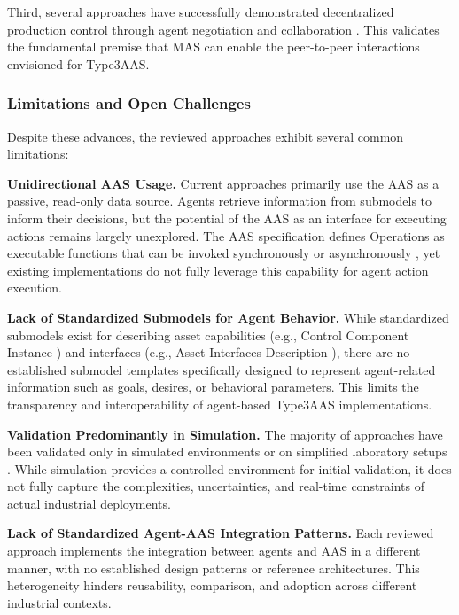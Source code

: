 Third, several approaches have successfully demonstrated decentralized production control through agent negotiation and collaboration \cite{sakurada2022engineering, siatras2024production}. This validates the fundamental premise that \ac{MAS} can enable the peer-to-peer interactions envisioned for \ac{Type3AAS}.

\subsubsection{Limitations and Open Challenges}

Despite these advances, the reviewed approaches exhibit several common limitations:

\textbf{Unidirectional AAS Usage.} Current approaches primarily use the \ac{AAS} as a passive, read-only data source. Agents retrieve information from submodels to inform their decisions, but the potential of the \ac{AAS} as an interface for executing actions remains largely unexplored. The \ac{AAS} specification defines Operations as executable functions that can be invoked synchronously or asynchronously \cite{plattformI40_aas_part2}, yet existing implementations do not fully leverage this capability for agent action execution.

\textbf{Lack of Standardized Submodels for Agent Behavior.} While standardized submodels exist for describing asset capabilities (e.g., Control Component Instance \cite{idta2023controlcomponent}) and interfaces (e.g., Asset Interfaces Description \cite{industrial2024idta}), there are no established submodel templates specifically designed to represent agent-related information such as goals, desires, or behavioral parameters. This limits the transparency and interoperability of agent-based \ac{Type3AAS} implementations.

\textbf{Validation Predominantly in Simulation.} The majority of approaches have been validated only in simulated environments \cite{sakurada2022engineering} or on simplified laboratory setups \cite{vogel2021approach}. While simulation provides a controlled environment for initial validation, it does not fully capture the complexities, uncertainties, and real-time constraints of actual industrial deployments.

\textbf{Lack of Standardized Agent-AAS Integration Patterns.} Each reviewed approach implements the integration between agents and \ac{AAS} in a different manner, with no established design patterns or reference architectures. This heterogeneity hinders reusability, comparison, and adoption across different industrial contexts.

